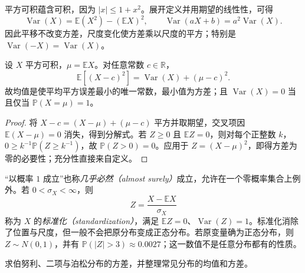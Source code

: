 平方可积蕴含可积，因为 $|x|\le1+x^2$。展开定义并用期望的线性性，可得
\begin{equation}
  \operatorname{Var}(X)=\mathbb E(X^2)-(\mathbb E X)^2,
  \qquad
  \operatorname{Var}(aX+b)=a^2\operatorname{Var}(X).
  \label{eq:study-variance-calculation}
\end{equation}
因此平移不改变方差，尺度变化使方差乘以尺度的平方；特别是 $\operatorname{Var}(-X)=\operatorname{Var}(X)$。

\begin{proposition}
\label{prop:study-variance-minimum}
设 $X$ 平方可积，$\mu=\mathbb E X$。对任意常数 $c\in\mathbb R$，
\begin{equation}
  \mathbb E[(X-c)^2]=\operatorname{Var}(X)+(\mu-c)^2.
  \label{eq:study-mean-square-decomposition}
\end{equation}
故均值是使平均平方误差最小的唯一常数，最小值为方差；且 $\operatorname{Var}(X)=0$ 当且仅当 $\mathbb P(X=\mu)=1$。
\end{proposition}

\begin{proof}
将 $X-c=(X-\mu)+(\mu-c)$ 平方并取期望，交叉项因 $\mathbb E(X-\mu)=0$ 消失，得到分解式。若 $Z\ge0$ 且 $\mathbb E Z=0$，则对每个正整数 $k$，$0\ge k^{-1}\mathbb P(Z\ge k^{-1})$，故 $\mathbb P(Z>0)=0$。应用于 $Z=(X-\mu)^2$，即得方差为零的必要性；充分性直接来自定义。
\end{proof}

“以概率 $1$ 成立”也称\emph{几乎必然（almost surely）}成立，允许在一个零概率集合上例外。若 $0<\sigma_X<\infty$，则
\[
  Z=\frac{X-\mathbb E X}{\sigma_X}
\]
称为 $X$ 的\emph{标准化（standardization）}，满足 $\mathbb E Z=0$、$\operatorname{Var}(Z)=1$。标准化消除了位置与尺度，但一般不会把原分布变成正态分布。若原变量确为正态分布，则 $Z\sim N(0,1)$，并有 $\mathbb P(|Z|>3)\approx0.0027$；这一数值不是任意分布都有的性质。

\begin{example}
\label{ex:study-common-variances}
求伯努利、二项与泊松分布的方差，并整理常见分布的均值和方差。
\end{example}

